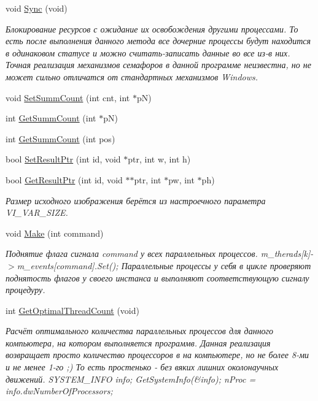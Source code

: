 \begin{DoxyCompactItemize}
void \hyperlink{class_c_v_i_engine_base_af12866653055639e69a61224615af7fe}{Sync} (void)
\begin{DoxyCompactList}\small\item\em Блокирование ресурсов с ожидание их освобождения другими процессами. То есть после выполнения данного метода все дочерние процессы будут находится в одинаковом статусе и можно считать-\/записать данные во все из-\/в них. Точная реализация механизмов семафоров в данной программе неизвестна, но не может сильно отличатся от стандартных механизмов Windows. \end{DoxyCompactList}\item 
void \hyperlink{class_c_v_i_engine_base_a4b6c77fcb50dcb01f299d7e0f4b05ea6}{Set\+Summ\+Count} (int cnt, int $\ast$p\+N)
\item 
int \hyperlink{class_c_v_i_engine_base_adb6193dca9e4f6c71ad6e77df88bc9f7}{Get\+Summ\+Count} (int $\ast$p\+N)
\item 
int \hyperlink{class_c_v_i_engine_base_a354f23eda839e4aff3b578fc5ad50363}{Get\+Summ\+Count} (int pos)
\item 
bool \hyperlink{class_c_v_i_engine_base_a38d38d266d48fad44435eec46a1086a6}{Set\+Result\+Ptr} (int id, void $\ast$ptr, int w, int h)
\item 
bool \hyperlink{class_c_v_i_engine_base_a99f7df701bfe9d53121e5cd00167e591}{Get\+Result\+Ptr} (int id, void $\ast$$\ast$ptr, int $\ast$pw, int $\ast$ph)
\begin{DoxyCompactList}\small\item\em Размер исходного изображения берётся из настроечного параметра V\+I\+\_\+\+V\+A\+R\+\_\+\+S\+I\+Z\+E. \end{DoxyCompactList}\item 
void \hyperlink{class_c_v_i_engine_base_aa59b55fc315394f4c19cb7d95c399913}{Make} (int command)
\begin{DoxyCompactList}\small\item\em Поднятие флага сигнала command у всех параллельных процессов. m\+\_\+therads\mbox{[}k\mbox{]}-\/$>$m\+\_\+events\mbox{[}command\mbox{]}.Set(); Параллельные процессы у себя в цикле проверяют поднятость флагов у своего инстанса и выполняют соответствующую сигналу процедуру. \end{DoxyCompactList}\item 
int \hyperlink{class_c_v_i_engine_base_a1e0174d46d3d28931a648e0437f0686d}{Get\+Optimal\+Thread\+Count} (void)
\begin{DoxyCompactList}\small\item\em Расчёт оптимального количества параллельных процессов для данного компьютера, на котором выполняется программв. Данная реализация возвращает просто количество процессоров в на компьютере, но не более 8-\/ми и не менее 1-\/го ;) То есть простенько -\/ без вяких лишних околонаучных движений. S\+Y\+S\+T\+E\+M\+\_\+\+I\+N\+F\+O info; Get\+System\+Info(\&info); n\+Proc = info.\+dw\+Number\+Of\+Processors; \end{DoxyCompactList}\item 
$$
\end{DoxyCompactItemize}
